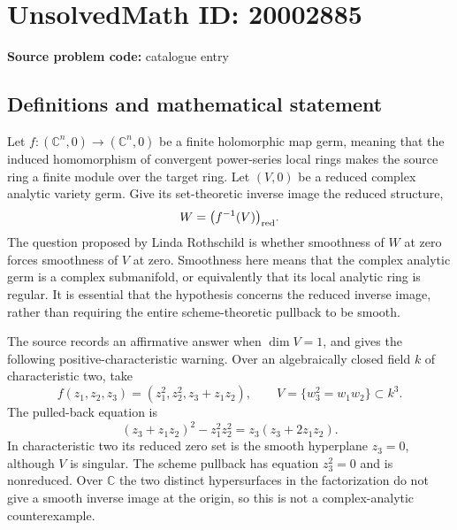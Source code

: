 \documentclass[11pt]{article}
\newcommand{\C}{\mathbb{C}}
\begin{document}
\section*{UnsolvedMath ID: 20002885}
\textbf{Source problem code:} catalogue entry
\subsection{Definitions and mathematical statement}
Let \(f:(\C^n,0)\to(\C^n,0)\) be a finite holomorphic map germ, meaning that the induced homomorphism of convergent power-series local rings makes the source ring a finite module over the target ring. Let \((V,0)\) be a reduced complex analytic variety germ. Give its set-theoretic inverse image the reduced structure,
\[
W=\bigl(f^{-1}(V)\bigr)_{\rm red}.
\]
The question proposed by Linda Rothschild is whether smoothness of \(W\) at zero forces smoothness of \(V\) at zero. Smoothness here means that the complex analytic germ is a complex submanifold, or equivalently that its local analytic ring is regular. It is essential that the hypothesis concerns the reduced inverse image, rather than requiring the entire scheme-theoretic pullback to be smooth.

The source records an affirmative answer when \(\dim V=1\), and gives the following positive-characteristic warning. Over an algebraically closed field \(k\) of characteristic two, take
\[
f(z_1,z_2,z_3)=(z_1^2,z_2^2,z_3+z_1z_2),\qquad
V=\{w_3^2=w_1w_2\}\subset k^3.
\]
The pulled-back equation is
\[
(z_3+z_1z_2)^2-z_1^2z_2^2=z_3(z_3+2z_1z_2).
\]
In characteristic two its reduced zero set is the smooth hyperplane \(z_3=0\), although \(V\) is singular. The scheme pullback has equation \(z_3^2=0\) and is nonreduced. Over \(\C\) the two distinct hypersurfaces in the factorization do not give a smooth inverse image at the origin, so this is not a complex-analytic counterexample.
\end{document}
